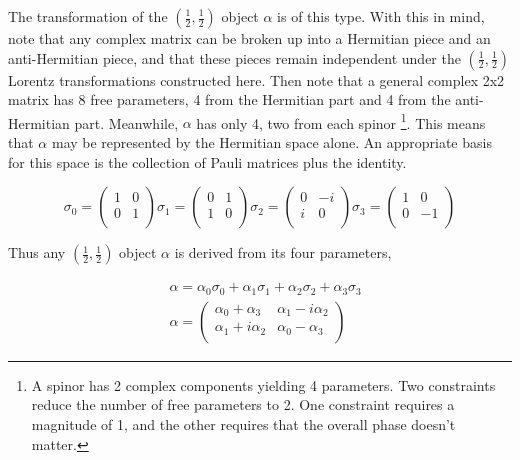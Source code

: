 The transformation of the $(\frac{1}{2}, \frac{1}{2})$ object $\alpha$ is of this type. With this in mind, note that any complex matrix can be broken up into a Hermitian piece and an anti-Hermitian piece, and that these pieces remain independent under the $(\frac{1}{2}, \frac{1}{2})$ Lorentz transformations constructed here. Then note that a general complex 2x2 matrix has 8 free parameters, 4 from the Hermitian part and 4 from the anti-Hermitian part. Meanwhile, $\alpha$ has only 4, two from each spinor \footnote{A spinor has 2 complex components yielding 4 parameters. Two constraints reduce the number of free parameters to 2. One constraint requires a magnitude of 1, and the other requires that the overall phase doesn't matter.}. This means that $\alpha$ may be represented by the Hermitian space alone. An appropriate basis for this space is the collection of Pauli matrices plus the identity.

\begin{equation}
\sigma_0 =  
\begin{pmatrix}
1 & 0 \\
0 & 1 \\
\end{pmatrix}
\sigma_1 =  
\begin{pmatrix}
0 & 1 \\
1 & 0 \\
\end{pmatrix}
\sigma_2 = 
\begin{pmatrix}
0 & -i \\
i & 0 \\
\end{pmatrix}
\sigma_3 = 
\begin{pmatrix}
1 & 0 \\
0 & -1 \\
\end{pmatrix}
\end{equation}

Thus any $(\frac{1}{2}, \frac{1}{2})$ object $\alpha$ is derived from its four parameters, 

\begin{equation}
\begin{split}
&\alpha = \alpha_0 \sigma_0 + \alpha_1 \sigma_1 + \alpha_2 \sigma_2 + \alpha_3 \sigma_3 \\
&\alpha = 
\begin{pmatrix}
\alpha_0 + \alpha_3 & \alpha_1 - i\alpha_2 \\
\alpha_1 + i\alpha_2 & \alpha_0 - \alpha_3 \\
\end{pmatrix}
\end{split}
\end{equation}

